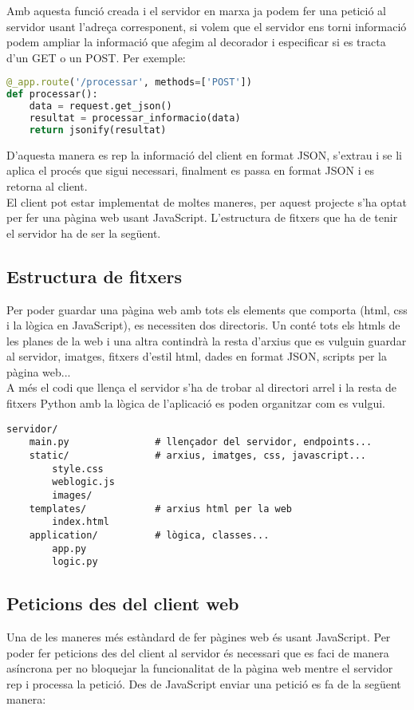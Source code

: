 Amb aquesta funció creada i el servidor en marxa ja podem fer una petició al servidor usant l'adreça corresponent, si volem que el servidor ens torni informació podem ampliar la informació que afegim al decorador i especificar si es tracta d'un GET o un POST. Per exemple:\\

\begin{lstlisting}[language=Python, caption=Declaració d'un endpoint]
@_app.route('/processar', methods=['POST'])
def processar():
    data = request.get_json()
    resultat = processar_informacio(data)
    return jsonify(resultat)
\end{lstlisting}

D'aquesta manera es rep la informació del client en format JSON, s'extrau i se li aplica el procés que sigui necessari, finalment es passa en format JSON i es retorna al client.\\
El client pot estar implementat de moltes maneres, per aquest projecte s'ha optat per fer una pàgina web usant JavaScript. L'estructura de fitxers que ha de tenir el servidor ha de ser la següent.

\subsection{Estructura de fitxers}
Per poder guardar una pàgina web amb tots els elements que comporta (html, css i la lògica en JavaScript), es necessiten dos directoris. Un conté tots els htmls de les planes de la web i una altra contindrà la resta d'arxius que es vulguin guardar al servidor, imatges, fitxers d'estil html, dades en format JSON, scripts per la pàgina web...\\
A més el codi que llença el servidor s'ha de trobar al directori arrel i la resta de fitxers Python amb la lògica de l'aplicació es poden organitzar com es vulgui.
\begin{verbatim}
servidor/
    main.py               # llençador del servidor, endpoints...
    static/               # arxius, imatges, css, javascript...
        style.css
        weblogic.js
        images/
    templates/            # arxius html per la web
        index.html
    application/          # lògica, classes...
        app.py
        logic.py
\end{verbatim}

\subsection{Peticions des del client web}
Una de les maneres més estàndard de fer pàgines web és usant JavaScript. Per poder fer peticions des del client al servidor és necessari que es faci de manera asíncrona per no bloquejar la funcionalitat de la pàgina web mentre el servidor rep i processa la petició. Des de JavaScript enviar una petició es fa de la següent manera:

